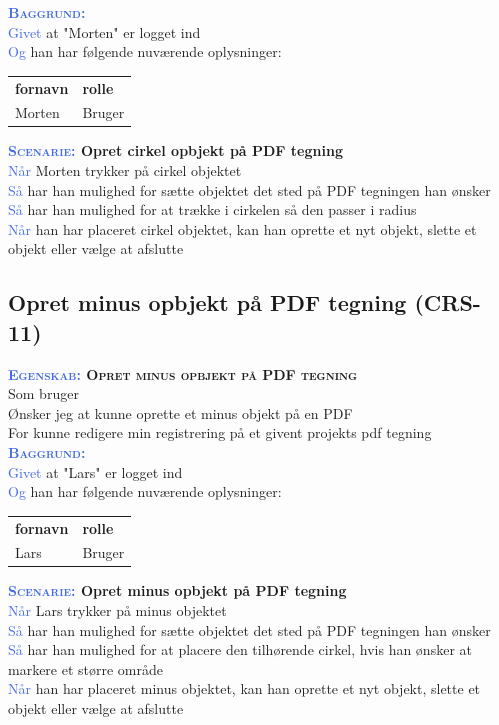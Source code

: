 \textsc{\textcolor{RoyalBlue}{\textbf{Baggrund:}}}\\
\textcolor{RoyalBlue}{Givet} at "Morten" er logget ind\\
\textcolor{RoyalBlue}{Og} han har følgende nuværende oplysninger:\\
\begin{tabular}{| l | l |}
	\textbf{fornavn} & \textbf{rolle} \\
	Morten & Bruger\\
\end{tabular}

\textbf{\textsc{\textcolor{RoyalBlue}{Scenarie:}} Opret cirkel opbjekt på PDF tegning}\\
\textcolor{RoyalBlue}{Når} Morten trykker på cirkel objektet\\
\textcolor{RoyalBlue}{Så}  har han mulighed for sætte objektet det sted på PDF tegningen han ønsker\\
\textcolor{RoyalBlue}{Så}  har han mulighed for at trække i cirkelen så den passer i radius\\
\textcolor{RoyalBlue}{Når} han har placeret cirkel objektet, kan han oprette et nyt objekt, slette et objekt eller vælge at afslutte \\

\subsection{Opret minus opbjekt på PDF tegning (CRS-11)} \label{sec:USOpretMinusObjekt}
\textbf{\textsc{\textcolor{RoyalBlue}{Egenskab:} Opret minus opbjekt på PDF tegning}}\\
Som bruger\\
Ønsker jeg at kunne oprette et minus objekt på en PDF\\
For kunne redigere min registrering på et givent projekts pdf tegning\\

\textsc{\textcolor{RoyalBlue}{\textbf{Baggrund:}}}\\
\textcolor{RoyalBlue}{Givet} at "Lars" er logget ind\\
\textcolor{RoyalBlue}{Og} han har følgende nuværende oplysninger:\\
\begin{tabular}{| l | l |}
	\textbf{fornavn} & \textbf{rolle} \\
	Lars & Bruger\\
\end{tabular}

\textbf{\textsc{\textcolor{RoyalBlue}{Scenarie:}} Opret minus opbjekt på PDF tegning}\\
\textcolor{RoyalBlue}{Når} Lars trykker på minus objektet\\
\textcolor{RoyalBlue}{Så}  har han mulighed for sætte objektet det sted på PDF tegningen han ønsker\\
\textcolor{RoyalBlue}{Så}  har han mulighed for at placere den tilhørende cirkel, hvis han ønsker at markere et større område\\
\textcolor{RoyalBlue}{Når} han har placeret minus objektet, kan han oprette et nyt objekt, slette et objekt eller vælge at afslutte \\

